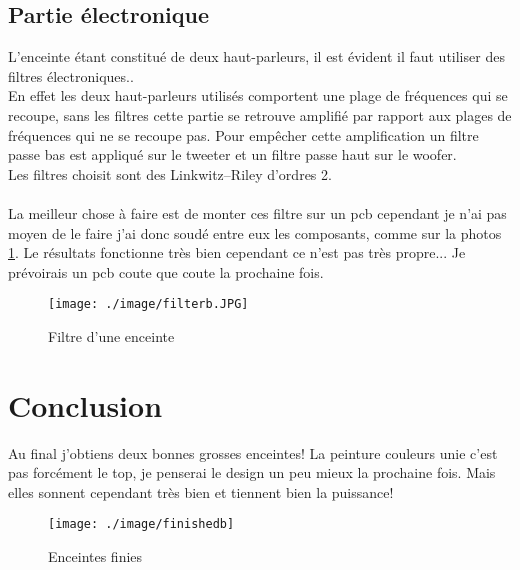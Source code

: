 \documentclass[a4paper,english]{report}
\begin{document}
			\section{Partie électronique}
			L'enceinte étant constitué de deux haut-parleurs, il est évident il faut utiliser des filtres électroniques..\\
			En effet les deux haut-parleurs utilisés comportent une plage de fréquences qui se recoupe, sans les filtres cette partie se retrouve amplifié par rapport aux plages de fréquences qui ne se recoupe pas. Pour empêcher cette amplification un filtre passe bas est appliqué sur le tweeter et un filtre passe haut sur le woofer.\\ Les filtres choisit sont des Linkwitz–Riley d'ordres 2.\\ \\ La meilleur chose à faire est de monter ces filtre sur un pcb cependant je n'ai pas moyen de le faire j'ai donc soudé entre eux les composants, comme sur la photos \ref{Filtre d'une enceinte}. Le résultats fonctionne très bien cependant ce n'est pas très propre... Je prévoirais un pcb coute que coute la prochaine fois.
		
			\begin{figure}[H]
				\centering
				\texttt{[image: ./image/filterb.JPG]}
				\label{Filtre d'une enceinte}
				\caption{Filtre d'une enceinte}
			\end{figure}			
		\chapter{Conclusion}
		Au final j'obtiens deux bonnes grosses enceintes! La peinture couleurs unie c'est pas forcément le top, je penserai le design un peu mieux la prochaine fois. Mais elles sonnent cependant très bien et tiennent bien la puissance!
		\begin{figure}[H]
			\centering
			\texttt{[image: ./image/finishedb]}
			\label{end}
			\caption{Enceintes finies}
		\end{figure}
		
			
			
		
\end{document}
